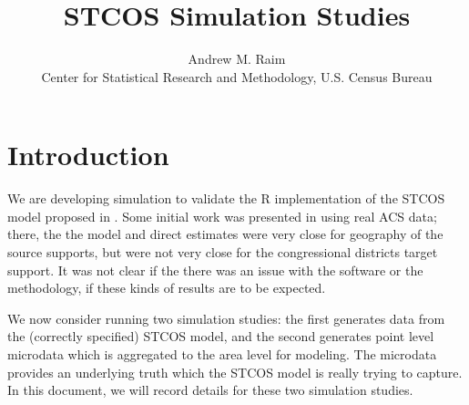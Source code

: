 \documentclass[12pt]{article}
\title{STCOS Simulation Studies}
\author{Andrew M. Raim
\vspace{0.5em} \\
Center for Statistical Research and Methodology, U.S. Census Bureau
}
\begin{document}
\maketitle

\section{Introduction}
\label{sec:intro}
We are developing simulation to validate the R implementation of the STCOS model proposed in \citet{BradleyEtAl2016-STAT}. Some initial work was presented in \citet{JSM2017-STCOS} using real ACS data; there, the the model and direct estimates were very close for geography of the source supports, but were not very close for the congressional districts target support. It was not clear if the there was an issue with the software or the methodology, if these kinds of results are to be expected.

We now consider running two simulation studies: the first generates data from the (correctly specified) STCOS model, and the second generates point level microdata which is aggregated to the area level for modeling. The microdata provides an underlying truth which the STCOS model is really trying to capture. In this document, we will record details for these two simulation studies.
\end{document}
